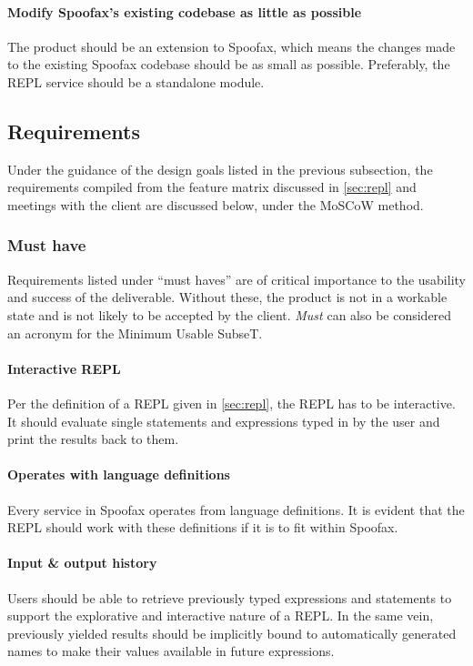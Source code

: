 \paragraph{Modify Spoofax's existing codebase as little as possible} The product
should be an extension to Spoofax, which means the changes made to the existing
Spoofax codebase should be as small as possible. Preferably, the REPL service
should be a standalone module.

\subsection{Requirements}
\label{ssec:requirements}

Under the guidance of the design goals listed in the previous subsection, the
requirements compiled from the feature matrix discussed in \cref{sec:repl} and
meetings with the client are discussed below, under the MoSCoW method.

\subsubsection{Must have}

Requirements listed under ``must haves'' are of critical importance to the
usability and success of the deliverable. Without these, the product is not in a
workable state and is not likely to be accepted by the client. \emph{Must} can
also be considered an acronym for the Minimum Usable SubseT.

\paragraph{Interactive REPL} Per the definition of a REPL given in
\cref{sec:repl}, the REPL has to be interactive. It should evaluate single
statements and expressions typed in by the user and print the results back to
them.

\paragraph{Operates with language definitions} Every service in Spoofax operates
from language definitions. It is evident that the REPL should work with these
definitions if it is to fit within Spoofax.

\paragraph{Input \& output history} Users should be able to retrieve previously
typed expressions and statements to support the explorative and interactive
nature of a REPL. In the same vein, previously yielded results should be
implicitly bound to automatically generated names to make their values available
in future expressions.

